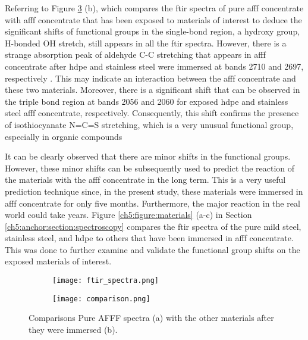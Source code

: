 Referring to Figure \ref{ch5:figure:spectra} (b), which compares the \acrshort{ftir} spectra of pure \acrshort{afff} concentrate with \acrshort{afff} concentrate that has been exposed to materials of interest to deduce the significant shifts of functional groups in the single-bond region, a hydroxy group, H-bonded OH stretch, still appears in all the \acrshort{ftir} spectra. However, there is a strange absorption peak of aldehyde C-C stretching that appears in \acrshort{afff} concentrate after \acrshort{hdpe} and stainless steel were immersed at bands 2710 and 2697, respectively \cite{lin1991handbook}. This may indicate an interaction between the \acrshort{afff} concentrate and these two materials. Moreover, there is a significant shift that can be observed in the triple bond region at bands 2056 and 2060 for exposed \acrshort{hdpe} and stainless steel \acrshort{afff} concentrate, respectively. Consequently, this shift confirms the presence of isothiocyanate N=C=S stretching, which is a very unusual functional group, especially in organic compounds

It can be clearly observed that there are minor shifts in the functional groups. However, these minor shifts can be subsequently used to predict the reaction of the materials with the \acrshort{afff} concentrate in the long term. This is a very useful prediction technique since, in the present study, these materials were immersed in \acrshort{afff} concentrate for only five months. Furthermore, the major reaction in the real world could take years. Figure \ref{ch5:figure:materials} (a-c) in Section \ref{ch5:anchor:section:spectroscopy} compares the \acrshort{ftir} spectra of the pure mild steel, stainless steel, and \acrshort{hdpe} to others that have been immersed in \acrshort{afff} concentrate. This was done to further examine and validate the functional group shifts on the exposed materials of interest.

\begin{figure}[H]
\centering

\begin{subfigure}{.45\textwidth}
    \texttt{[image: ftir\_spectra.png]}
    \caption{}
    \label{ch5:figure:spectra:a}
\end{subfigure}
\begin{subfigure}{.45\textwidth}
    \texttt{[image: comparison.png]}
    \caption{}
    \label{ch5:figure:spectra:b}
\end{subfigure}

\caption{Comparisons Pure AFFF spectra (a) with the other materials after they were immersed (b).}
\label{ch5:figure:spectra}
\end{figure}

